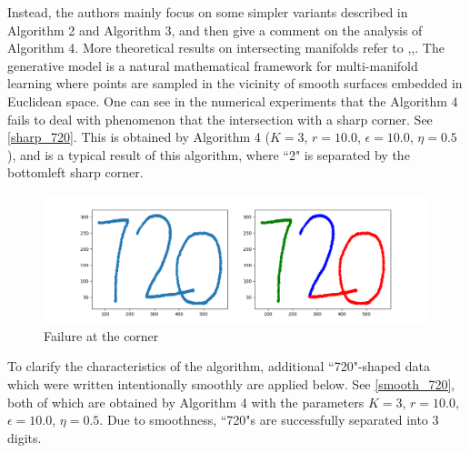 \documentclass{article}
\begin{document}
Instead, the authors mainly focus on some simpler variants described in Algorithm 2 and Algorithm 3, and then give a comment on the analysis of Algorithm 4.
More theoretical results on intersecting manifolds 
refer to \cite{arias2011},\cite{chen2009},\cite{soltanolkotabi2012}.
The generative model is a natural mathematical framework for multi-manifold learning where points are sampled in the vicinity of smooth surfaces embedded in Euclidean space.
One can see in the numerical experiments that the Algorithm 4 fails to deal with phenomenon that the intersection with a sharp corner.
See \autoref{sharp_720}. This is obtained by  Algorithm 4  ($K = 3$, $r = 10.0$, $\epsilon = 10.0$, $\eta = 0.5$), and is a typical result of this algorithm, where ``2" is separated by the bottomleft sharp corner.
\begin{figure}[htbp]
\centering
\vspace{-1em}
\includegraphics[width=0.8  \textwidth]{sharp_720.png}
\vspace{-1em}
\caption{Failure at the corner}
\label{sharp_720}
\end{figure}

To clarify the characteristics of the algorithm, additional ``720"-shaped data which were written intentionally smoothly are applied below.
See \autoref{smooth_720}, both of which are obtained by Algorithm 4 with the parameters $K = 3$, $r = 10.0$, $\epsilon = 10.0$, $\eta = 0.5$.
Due to smoothness, ``720"s are successfully separated into 3 digits.
\end{document}
